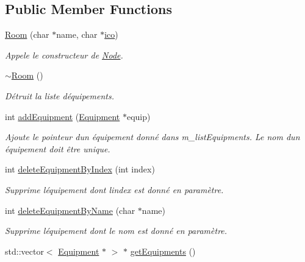 \subsection*{Public Member Functions}
\begin{DoxyCompactItemize}
\item 
\hyperlink{class_e_p_1_1_room_aefc0919f87a1f6dcfde24923719e6b90}{Room} (char $\ast$name, char $\ast$\hyperlink{namespace_e_p_a9bb18717237cbb94269e26c77cc04b05}{ico})
\begin{DoxyCompactList}\small\item\em Appele le constructeur de \hyperlink{class_e_p_1_1_node}{Node}. \end{DoxyCompactList}\item 
\hyperlink{class_e_p_1_1_room_a1dba2dc4fdec31c930b5f538bb4018cf}{$\sim$\+Room} ()
\begin{DoxyCompactList}\small\item\em Détruit la liste d\textquotesingle{}équipements. \end{DoxyCompactList}\item 
int \hyperlink{class_e_p_1_1_room_a818eb638f5796bfc45a519ce503c30be}{add\+Equipment} (\hyperlink{class_e_p_1_1_equipment}{Equipment} $\ast$equip)
\begin{DoxyCompactList}\small\item\em Ajoute le pointeur d\textquotesingle{}un équipement donné dans m\+\_\+list\+Equipments. Le nom d\textquotesingle{}un équipement doit être unique. \end{DoxyCompactList}\item 
int \hyperlink{class_e_p_1_1_room_a9d9a93b373460edb886a05e8942aa589}{delete\+Equipment\+By\+Index} (int index)
\begin{DoxyCompactList}\small\item\em Supprime l\textquotesingle{}équipement dont l\textquotesingle{}index est donné en paramètre. \end{DoxyCompactList}\item 
int \hyperlink{class_e_p_1_1_room_a4879b1eeebccc1a3c2f5ece234f73da9}{delete\+Equipment\+By\+Name} (char $\ast$name)
\begin{DoxyCompactList}\small\item\em Supprime l\textquotesingle{}équipement dont le nom est donné en paramètre. \end{DoxyCompactList}\item 
std\+::vector$<$ \hyperlink{class_e_p_1_1_equipment}{Equipment} $\ast$ $>$ $\ast$ \hyperlink{class_e_p_1_1_room_ad4993f6208f136a9f1bd082def0d53c0}{get\+Equipments} ()

\end{DoxyCompactItemize}

